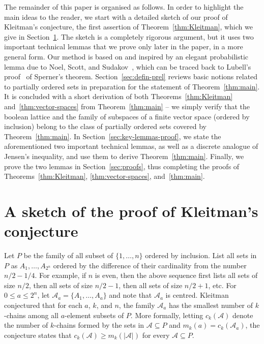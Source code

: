 \documentclass[11pt,a4paper,reqno]{amsart}
\numberwithin{claim}{thm}
\theoremstyle{definition}
\newcommand{\cA}{\mathcal{A}}
\renewcommand{\le}{\leqslant}
\renewcommand{\ge}{\geqslant}
\begin{document}
The remainder of this paper is organised as follows. In order to highlight the main ideas to the reader, we start with a detailed sketch of our proof of Kleitman's conjecture, the first assertion of Theorem~\ref{thm:Kleitman}, which we give in Section~\ref{sec:proof-sketch}. The sketch is a completely rigorous argument, but it uses two important technical lemmas that we prove only later in the paper, in a more general form. Our method is based on and inspired by an elegant probabilistic lemma due to Noel, Scott, and Sudakov~\cite[Lemma~2.2]{NoScSu}, which can be traced back to Lubell's proof~\cite{Lu66} of Sperner's theorem. Section~\ref{sec:defin-prel} reviews basic notions related to partially ordered sets in preparation for the statement of Theorem~\ref{thm:main}. It is concluded with a short derivation of both Theorems~\ref{thm:Kleitman} and~\ref{thm:vector-spaces} from Theorem~\ref{thm:main} -- we simply verify that the boolean lattice and the family of subspaces of a finite vector space (ordered by inclusion) belong to the class of partially ordered sets covered by Theorem~\ref{thm:main}. In Section~\ref{sec:key-lemmas-proof}, we state the aforementioned two important technical lemmas, as well as a discrete analogue of Jensen's inequality, and use them to derive Theorem~\ref{thm:main}. Finally, we prove the two lemmas in Section~\ref{sec:proofs}, thus completing the proofs of Theorems~\ref{thm:Kleitman}, \ref{thm:vector-spaces}, and~\ref{thm:main}.

\section{A sketch of the proof of Kleitman's conjecture}
\label{sec:proof-sketch}

Let $P$ be the family of all subset of $\{1, \dotsc, n\}$ ordered by inclusion. List all sets in $P$ as $A_1, \dotsc, A_{2^n}$ ordered by the difference of their cardinality from the number $n/2-1/4$. For example, if $n$ is even, then the above sequence first lists all sets of size $n/2$, then all sets of size $n/2-1$, then all sets of size $n/2+1$, etc. For $0 \le a \le 2^n$, let $\cA_a = \{A_1, \dotsc, A_a\}$ and note that $\cA_a$ is centred. Kleitman conjectured that for each $a$, $k$, and $n$, the family $\cA_a$ has the smallest number of $k$-chains among all $a$-element subsets of $P$. More formally, letting $c_k(\cA)$ denote the number of $k$-chains formed by the sets in $\cA \subseteq P$ and $m_k(a) = c_k(\cA_a)$, the conjecture states that $c_k(\cA) \ge m_k(|\cA|)$ for every $\cA \subseteq P$.
\end{document}
